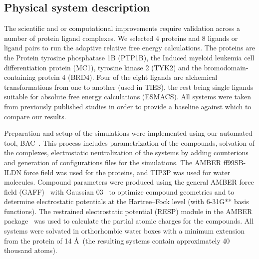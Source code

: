 \subsection{Physical system description}

The scientific and or computational improvements require validation across a 
number of protein ligand complexes. 
We selected 4 proteins and 8 ligands or ligand pairs to run the adaptive 
relative free energy calculations. 
The proteins are the Protein tyrosine phosphatase 1B (PTP1B), the Induced myeloid leukemia cell differentiation protein (MC1), tyrosine kinase 2 (TYK2) and the bromodomain-containing protein 4 (BRD4). 
Four of the eight ligands are alchemical transformations from one to another (used in TIES), the rest being single ligands suitable for absolute free energy calculations (ESMACS).
All systems were taken from previously published studies \cite{} in order to 
provide a baseline against which to compare our results.

Preparation and setup of the simulations were implemented using our automated tool, BAC~\cite{Sadiq2008}. This process includes parametrization of the compounds, solvation of the complexes, electrostatic neutralization of the systems by adding counterions and generation of configurations files for the simulations. The AMBER ff99SB-ILDN \cite{Lindorff-Larsen2010} force field was used for the proteins, and TIP3P was used for water molecules. Compound parameters were produced using the general AMBER force field (GAFF)~\cite{Wang2004} with Gaussian 03~\cite{Frisch} to optimize compound geometries and to determine electrostatic potentials at the Hartree–Fock level (with 6-31G** basis functions). The restrained electrostatic potential (RESP) module in the AMBER package~\cite{Case2005} was used to calculate the partial atomic charges for the compounds. All systems were solvated in orthorhombic water boxes with a minimum extension from the protein of 14 \AA\ (the resulting systems contain approximately 40 thousand atoms).

